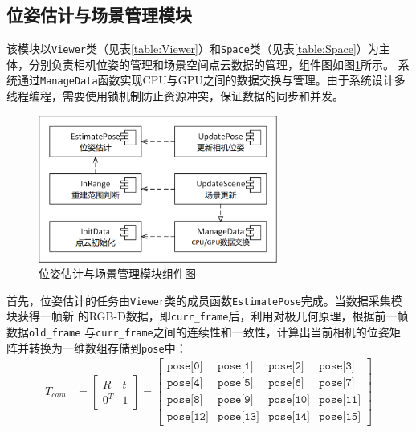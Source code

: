 \subsection{位姿估计与场景管理模块}
\par 该模块以\texttt{Viewer}类（见表\ref{table:Viewer}）和\texttt{Space}类（见表\ref{table:Space}）为主体，分别负责相机位姿的管理和场景空间点云数据的管理，组件图如图\ref{fig:component2}所示。
系统通过\texttt{ManageData}函数实现CPU与GPU之间的数据交换与管理。由于系统设计多线程编程，需要使用锁机制防止资源冲突，保证数据的同步和并发。

\begin{figure}[htb]
	\centering
	\includegraphics[width=0.7\textwidth]{figures/uml/component2.png}
	\caption{位姿估计与场景管理模块组件图}
	\label{fig:component2}
\end{figure}

\par 首先，位姿估计的任务由\texttt{Viewer}类的成员函数\texttt{EstimatePose}完成。当数据采集模块获得一帧新
的RGB-D数据，即\texttt{curr\_frame}后，利用对极几何原理，根据前一帧数据\texttt{old\_frame}
与\texttt{curr\_frame}之间的连续性和一致性，计算出当前相机的位姿矩阵并转换为一维数组存储到\texttt{pose}中：
\begin{align}
	T_{cam} & =
	\begin{bmatrix}
		R   & t \\
		0^T & 1
	\end{bmatrix}
	=
	\begin{bmatrix}
		\texttt{pose[0]}  & \texttt{pose[1]}  & \texttt{pose[2]}  & \texttt{pose[3]}  \\
		\texttt{pose[4]}  & \texttt{pose[5]}  & \texttt{pose[6]}  & \texttt{pose[7]}  \\
		\texttt{pose[8]}  & \texttt{pose[9]}  & \texttt{pose[10]} & \texttt{pose[11]} \\
		\texttt{pose[12]} & \texttt{pose[13]} & \texttt{pose[14]} & \texttt{pose[15]}
	\end{bmatrix}
\end{align}

